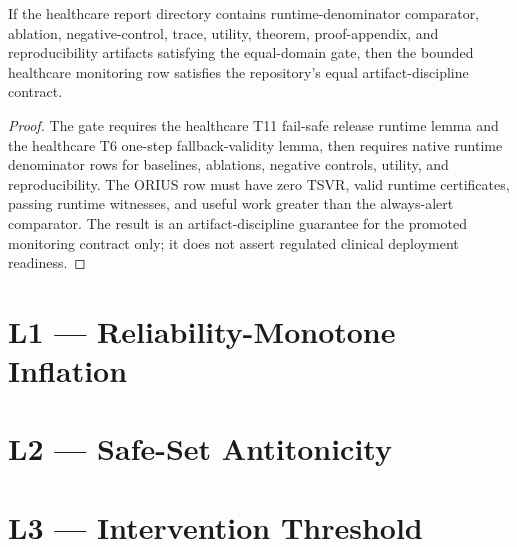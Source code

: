 \begin{lemma}
If the healthcare report directory contains runtime-denominator comparator,
ablation, negative-control, trace, utility, theorem, proof-appendix, and
reproducibility artifacts satisfying the equal-domain gate, then the bounded
healthcare monitoring row satisfies the repository's equal
artifact-discipline contract.
\end{lemma}

\begin{proof}
The gate requires the healthcare T11 fail-safe release runtime lemma and the
healthcare T6 one-step fallback-validity lemma, then requires native runtime
denominator rows for baselines, ablations, negative controls, utility, and
reproducibility.  The ORIUS row must have zero TSVR, valid runtime
certificates, passing runtime witnesses, and useful work greater than the
always-alert comparator.  The result is an artifact-discipline guarantee for
the promoted monitoring contract only; it does not assert regulated clinical
deployment readiness.
\end{proof}

\section{L1 --- Reliability-Monotone Inflation}\label{sec:proof-L1}


\section{L2 --- Safe-Set Antitonicity}\label{sec:proof-L2}


\section{L3 --- Intervention Threshold}\label{sec:proof-L3}


